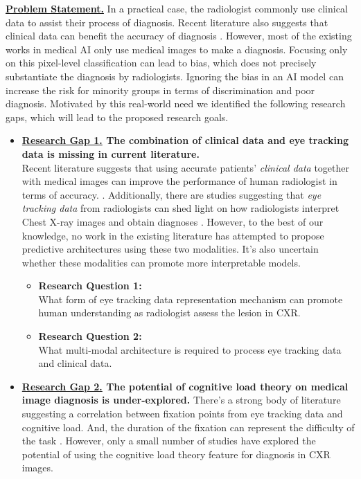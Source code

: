 \underline{\textbf{Problem Statement.}}
 In a practical case, the radiologist commonly use clinical data to assist their process of diagnosis. Recent literature also suggests that clinical data can benefit the accuracy of diagnosis \citep{Castillo2020ClinicalInformationOnRadiology, Leslie2000CTClinicalData}. However, most of the existing works in medical AI only use medical images to make a diagnosis. Focusing only on this pixel-level classification can lead to bias, which does not precisely substantiate the diagnosis by radiologists. Ignoring the bias in an AI model can increase the risk for minority groups in terms of discrimination and poor diagnosis. Motivated by this real-world need we identified the following research gaps, which will lead to the proposed research goals.

\begin{itemize}
    \item \textbf{\underline{Research Gap 1.} The combination of clinical data and eye tracking data is missing in current literature.} \\ Recent literature suggests that using accurate patients' \textit{clinical data} together with medical images can improve the performance of human radiologist in terms of accuracy. \citep{Castillo2020ClinicalInformationOnRadiology, Leslie2000CTClinicalData}. Additionally, there are studies suggesting that \textit{eye tracking data} from radiologists can shed light on how radiologists interpret Chest X-ray images and obtain diagnoses \citep{Karargyris2021EyeGazePaper, Lanfredi2021REFLACX}. However, to the best of our knowledge, no work in the existing literature has attempted to propose predictive architectures using these two modalities. It's also uncertain whether these modalities can promote more interpretable models.
          \begin{itemize}
              \item \textbf{Research Question 1:} \\ What form of eye tracking data representation mechanism can promote human understanding as radiologist assess the lesion in CXR.
              \item \textbf{Research Question 2:} \\  What multi-modal architecture is required to process eye tracking data and clinical data.
          \end{itemize}
    \item  \textbf{\underline{Research Gap 2.} The potential of cognitive load theory on medical image diagnosis is under-explored.} There's a strong body of literature suggesting a correlation between fixation points from eye tracking data and cognitive load. And, the duration of the fixation can represent the difficulty of the task \citep{Palinko2010EyeTrackingCognitiveLoad-1, Zagermann2016EyeTrackingCognitiveLoad-2, Wang2014EyeTrackingCognitiveLoad-3, Krejtz2018EyeTrackingCognitiveLoad-4,Klingner2010EyeTrackingCognitiveLoad-5}. However, only a small number of studies have explored the potential of using the cognitive load theory feature for diagnosis in CXR images.

\end{itemize}
